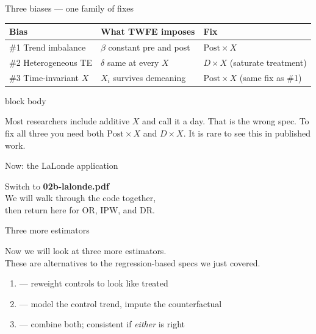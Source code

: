 \documentclass[aspectratio=169,11pt]{beamer}
\newcommand{\emphbox}[1]{%
  \begin{beamercolorbox}[rounded=true,sep=7pt,wd=\linewidth]{block body}%
    \small\color{slate}\raggedright #1%
  \end{beamercolorbox}}
\begin{document}

\begin{frame}{Three biases --- one family of fixes}
\vspace{0.3em}
{\small
\begin{tabular}{@{}lll@{}}
\toprule
\textbf{Bias} & \textbf{What TWFE imposes} & \textbf{Fix} \\
\midrule
\#1 Trend imbalance
  & $\beta$ constant pre and post
  & $\mathrm{Post}\times X$ \\[4pt]
\#2 Heterogeneous TE
  & $\delta$ same at every $X$
  & $D\times X$ (saturate treatment) \\[4pt]
\#3 Time-invariant $X$
  & $X_i$ survives demeaning
  & $\mathrm{Post}\times X$ (same fix as \#1) \\
\bottomrule
\end{tabular}
}
\vspace{0.5em}
\emphbox{Most researchers include additive $X$ and call it a day. That is the wrong spec.
To fix all three you need both $\mathrm{Post}\times X$ and $D\times X$.
It is rare to see this in published work.}
\end{frame}

\begin{frame}{Now: the LaLonde application}
\vspace{1.2em}
\begin{center}
\Large
Switch to \textbf{02b-lalonde.pdf}\\[0.8em]
\color{warmgray}\normalsize
We will walk through the code together,\\
then return here for OR, IPW, and DR.
\end{center}
\end{frame}


\begin{frame}{Three more estimators}
\vspace{0.8em}
\begin{center}
Now we will look at three more estimators.\\[0.5em]
These are alternatives to the regression-based specs we just covered.
\end{center}
\vspace{0.6em}
\begin{enumerate}\setlength\itemsep{0.5em}
  \item {} --- reweight controls to look like treated
  \item {} --- model the control trend, impute the counterfactual
  \item {} --- combine both; consistent if \textit{either} is right
\end{enumerate}
\end{frame}
\end{document}
